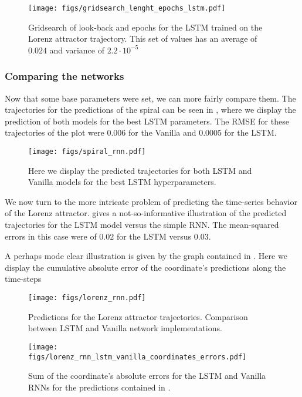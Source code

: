 \begin{figure}
    \centering
\texttt{[image: figs/gridsearch\_lenght\_epochs\_lstm.pdf]}
    \caption{Gridsearch of look-back and epochs for the
LSTM trained on the Lorenz attractor trajectory. This set of values has an average of $0.024$ and variance of $2.2 \cdot 10^{-5}$}
    \label{fig:hyperparams_lstm_lorenz}
\end{figure}



\subsubsection{Comparing the networks}

Now that some base parameters were set, we can more fairly compare them. The trajectories for the predictions of the spiral can be seen in , where we display the prediction of both models for the best LSTM parameters. The RMSE for these trajectories of the plot were $0.006$ for the Vanilla and $0.0005$ for the LSTM.

\begin{figure}[H]
\texttt{[image: figs/spiral\_rnn.pdf]}
    \caption{Here we display the predicted trajectories for both LSTM and Vanilla models for the best LSTM hyperparameters.}
    \label{fig:rnn_spiral}
\end{figure}

We now turn to the more intricate problem of predicting the time-series behavior of the Lorenz attractor.   gives a not-so-informative illustration of the predicted trajectories for the LSTM model versus the simple RNN. The mean-squared errors in this case were of $0.02$ for the LSTM versus $0.03$.

A perhaps mode clear illustration is given by the graph contained in . Here we display the cumulative absolute error of the coordinate's predictions along the time-steps


\begin{figure}[H]
\texttt{[image: figs/lorenz\_rnn.pdf]}
    \caption{Predictions for the Lorenz attractor trajectories. Comparison between LSTM and Vanilla network implementations.}
    \label{fig:rnn_lorenz}
\end{figure}


\begin{figure}[H]
\texttt{[image: figs/lorenz\_rnn\_lstm\_vanilla\_coordinates\_errors.pdf]}
    \caption{Sum of the coordinate's absolute errors for the LSTM and Vanilla RNNs for the predictions contained in .}
    \label{fig:rnn_coordinate_errors_lorenz}
\end{figure}


